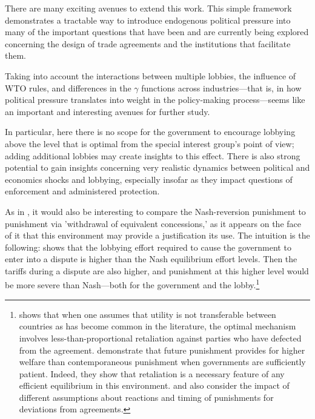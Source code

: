 \documentclass[12pt]{article}
\newcommand{\ga}{\gamma}
\begin{document}
There are many exciting avenues to extend this work. This simple framework demonstrates a tractable way to introduce endogenous political pressure into many of the important questions that have been and are currently being explored concerning the design of trade agreements and the institutions that facilitate them.


Taking into account the interactions between multiple lobbies, the influence of WTO rules, and differences in the $\ga$ functions across industries---that is, in how political pressure translates into weight in the policy-making process---seems like an important and interesting avenues for further study.

In particular, here there is no scope for the government to encourage lobbying above the level that is optimal from the special interest group's point of view; adding additional lobbies may create insights to this effect. There is also strong potential to gain insights concerning very realistic dynamics between political and economics shocks and lobbying, especially insofar as they impact questions of enforcement and administered protection.

As in \Textcite{zissimos}, it would also be interesting to compare the Nash-reversion punishment to punishment via 'withdrawal of equivalent concessions,' as it appears on the face of it that this environment may provide a justification its use. The intuition is the following: \Textcite{buzard2013a} shows that the lobbying effort required to cause the government to enter into a dispute is higher than the Nash equilibrium effort levels. Then the tariffs during a dispute are also higher, and punishment at this higher level would be more severe than Nash---both for the government and the lobby.\footnote{\Textcite{beshkar2010a} shows that when one assumes that utility is not transferable between countries as has become common in the literature, the optimal mechanism involves less-than-proportional retaliation against parties who have defected from the agreement. \Textcite{martinvergote} demonstrate that future punishment provides for higher welfare than contemporaneous punishment when governments are sufficiently patient. Indeed, they show that retaliation is a necessary feature of any efficient equilibrium in this environment. \Textcite{hungerford} and \Textcite{riezman1991} also consider the impact of different assumptions about reactions and timing of punishments for deviations from agreements.}
\end{document}
